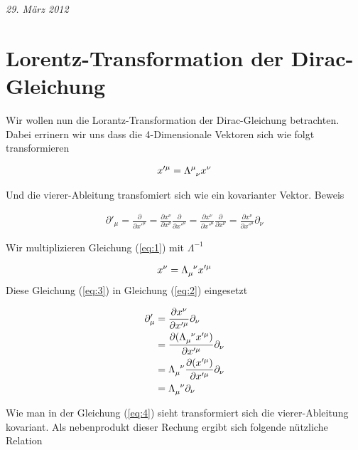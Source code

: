 
\usepackage{amsmath} 





\textit{29. März 2012}


\section*{Lorentz-Transformation der Dirac-Gleichung}

Wir wollen nun die Lorantz-Transformation der Dirac-Gleichung betrachten. Dabei errinern wir uns dass die 4-Dimensionale Vektoren sich wie folgt transformieren


\begin{align}
  \label{eq:1}
  x'^{\mu} = \Lambda^{\mu}_{\hphantom\mu \nu}x^{\nu}
\end{align}

Und die vierer-Ableitung transfomiert sich wie ein kovarianter Vektor. Beweis

\begin{align}
  \label{eq:2}
 \partial'_\mu =  \frac{\partial}{\partial x'^\mu} = \frac{\partial x^\nu}{\partial x^\nu } \frac{\partial}{\partial x'^\mu} = \frac{\partial x^\nu}{\partial x'^\mu } \frac{\partial}{\partial x^\nu} = \frac{\partial x^\nu}{\partial x'^\mu }\partial_\nu
\end{align}

Wir multiplizieren Gleichung (\ref{eq:1}) mit \(\Lambda^{-1}\)

\begin{align}
  \label{eq:3}
  x^{\nu} = \Lambda_{\mu}^{\hphantom\mu \nu}x'^\mu
\end{align}
Diese Gleichung (\ref{eq:3}) in Gleichung (\ref{eq:2}) eingesetzt

\begin{align}
  \label{eq:4}
   \partial'_\mu &= \frac{\partial x^\nu}{\partial x'^\mu } \partial_\nu \notag \\
&= \frac{\partial (\Lambda_{\mu}^{\hphantom\mu \nu}x'^\mu) }{\partial x'^\mu } \partial_\nu \notag \\
&= \Lambda_{\mu}^{\hphantom\mu \nu}\frac{\partial (x'^\mu) }{\partial x'^\mu } \partial_\nu  \notag\\
&= \Lambda_{\mu}^{\hphantom\mu \nu}\partial_\nu
\end{align}

Wie man in der Gleichung (\ref{eq:4}) sieht transformiert sich die vierer-Ableitung kovariant. Als nebenprodukt dieser Rechung ergibt sich folgende nützliche Relation

